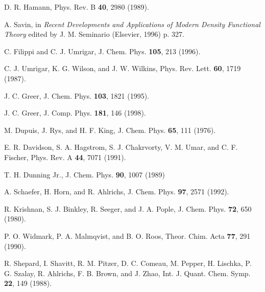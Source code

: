 \begin{thebibliography}{99}
 D. R. Hamann, Phys. Rev. B {\bf 40}, 2980 (1989).

 A. Savin, in 
{\it Recent Developments and Applications of Modern Density Functional Theory} 
edited by J. M. Seminario (Elsevier, 1996) p. 327.

 C. Filippi and C. J. Umrigar, 
J. Chem. Phys. {\bf 105}, 213 (1996).

 C. J. Umrigar, K. G. Wilson, and J. W. Wilkins, 
Phys. Rev. Lett. {\bf 60}, 1719 (1987).

 J. C. Greer, J. Chem. Phys. {\bf 103}, 1821 (1995).

 J. C. Greer, J. Comp. Phys. {\bf 181}, 146 (1998).

 M. Dupuis, J. Rys, and H. F. King, 
J. Chem. Phys. {\bf 65}, 111 (1976).

 E. R. Davidson, S. A. Hagstrom, S. J. Chakrvorty,
V. M. Umar, and C. F. Fischer, Phys. Rev. A {\bf 44}, 7071 (1991).

 T. H. Dunning Jr., J. Chem. Phys. {\bf 90}, 1007 (1989)

 A. Schaefer, H. Horn, and R. Ahlrichs, 
J. Chem. Phys. {\bf 97}, 2571 (1992).

  R. Krishnan, S. J. Binkley, R. Seeger, and J. A. Pople,  
J. Chem. Phys. {\bf 72}, 650 (1980).

 P. O. Widmark, P. A. Malmqvist, and B. O. Roos, 
Theor. Chim. Acta {\bf 77}, 291 (1990).

 R. Shepard, I. Shavitt, R. M. Pitzer, D. C. Comeau, 
M. Pepper, H. Lischka, P. G. Szalay, R. Ahlrichs, F. B. Brown, and J. Zhao,
Int. J. Quant. Chem. Symp.  {\bf 22}, 149 (1988).




\end{thebibliography}



